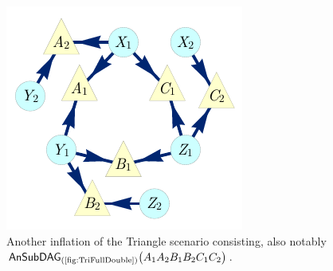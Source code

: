 \begin{figure}[h]
\begin{minipage}[b]{0.35\linewidth}
\centering
\includegraphics[scale=1]{TriDagSub222.pdf}
\caption{Another inflation of the Triangle scenario consisting, also notably $\ansubgraph[(\textrm{\cref{fig:TriFullDouble}})]{A_1 A_2 B_1 B_2 C_1 C_2}$.}\label{fig:Tri222}
\end{minipage}
\end{figure}

